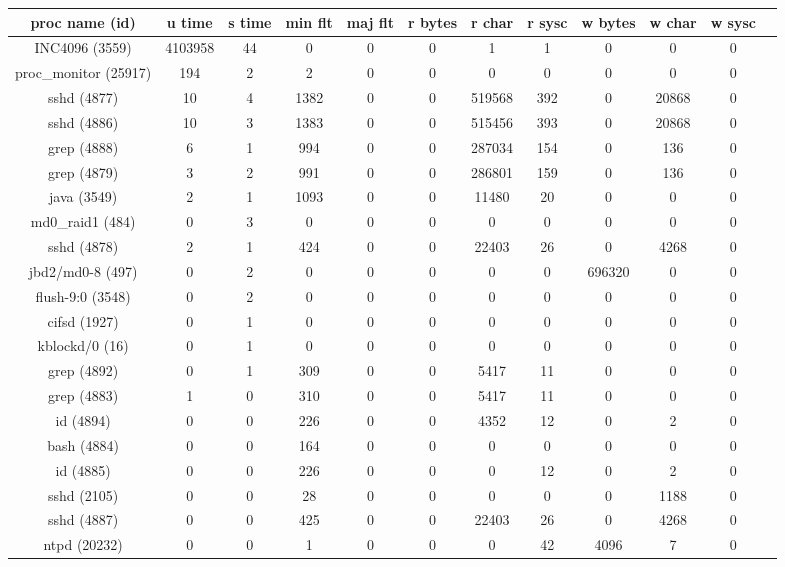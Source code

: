 \begin{table}[htp!]
\begin{center}
\begin{tabular}{|c|c|c|c|c|c|c|c|c|c|c|c|} \hline
proc name (id) & u time & s time & min flt & maj flt & r bytes & r char & r sysc & w bytes & w char & w sysc\\ \hline
INC4096 (3559) & 4103958 & 44 & 0 & 0 & 0 & 1 & 1 & 0 & 0 & 0 \\ \hline
proc\_monitor (25917) & 194 & 2 & 2 & 0 & 0 & 0 & 0 & 0 & 0 & 0 \\ \hline
sshd (4877) & 10 & 4 & 1382 & 0 & 0 & 519568 & 392 & 0 & 20868 & 0 \\ \hline
sshd (4886) & 10 & 3 & 1383 & 0 & 0 & 515456 & 393 & 0 & 20868 & 0 \\ \hline
grep (4888) & 6 & 1 & 994 & 0 & 0 & 287034 & 154 & 0 & 136 & 0 \\ \hline
grep (4879) & 3 & 2 & 991 & 0 & 0 & 286801 & 159 & 0 & 136 & 0 \\ \hline
java (3549) & 2 & 1 & 1093 & 0 & 0 & 11480 & 20 & 0 & 0 & 0 \\ \hline
md0\_raid1 (484) & 0 & 3 & 0 & 0 & 0 & 0 & 0 & 0 & 0 & 0 \\ \hline
sshd (4878) & 2 & 1 & 424 & 0 & 0 & 22403 & 26 & 0 & 4268 & 0 \\ \hline
jbd2/md0-8 (497) & 0 & 2 & 0 & 0 & 0 & 0 & 0 & 696320 & 0 & 0 \\ \hline
flush-9:0 (3548) & 0 & 2 & 0 & 0 & 0 & 0 & 0 & 0 & 0 & 0 \\ \hline
cifsd (1927) & 0 & 1 & 0 & 0 & 0 & 0 & 0 & 0 & 0 & 0 \\ \hline
kblockd/0 (16) & 0 & 1 & 0 & 0 & 0 & 0 & 0 & 0 & 0 & 0 \\ \hline
grep (4892) & 0 & 1 & 309 & 0 & 0 & 5417 & 11 & 0 & 0 & 0 \\ \hline
grep (4883) & 1 & 0 & 310 & 0 & 0 & 5417 & 11 & 0 & 0 & 0 \\ \hline
id (4894) & 0 & 0 & 226 & 0 & 0 & 4352 & 12 & 0 & 2 & 0 \\ \hline
bash (4884) & 0 & 0 & 164 & 0 & 0 & 0 & 0 & 0 & 0 & 0 \\ \hline
id (4885) & 0 & 0 & 226 & 0 & 0 & 0 & 12 & 0 & 2 & 0 \\ \hline
sshd (2105) & 0 & 0 & 28 & 0 & 0 & 0 & 0 & 0 & 1188 & 0 \\ \hline
sshd (4887) & 0 & 0 & 425 & 0 & 0 & 22403 &26 & 0 & 4268 & 0 \\ \hline
ntpd (20232) & 0 & 0 & 1 & 0 & 0 & 0 & 42 & 4096 & 7 & 0 \\ \hline

\end{tabular}
\end{center}
\end{table}
